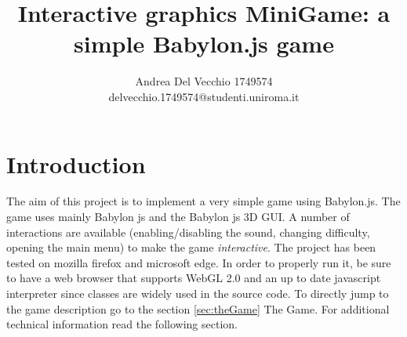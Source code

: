 \documentclass[14pt]{article}
\title{\textbf{Interactive graphics MiniGame: a simple Babylon.js game}}
\author{Andrea Del Vecchio 1749574\\
		delvecchio.1749574@studenti.uniroma.it}
\date{}
\begin{document}
\maketitle
\section{Introduction}
The aim of this project is to implement a very simple game using Babylon.js. The game uses mainly Babylon js and the Babylon js 3D GUI. A number of interactions are available (enabling/disabling the sound, changing difficulty, opening the main menu) to make the game \textit{interactive}. The project has been tested on mozilla firefox and microsoft edge. In order to properly run it, be sure to have a web browser that supports WebGL 2.0 and an up to date javascript interpreter since classes are widely used in the source code. To directly jump to the game description go to the section \ref{sec:theGame} The Game. For additional technical information read the following section.
\end{document}
